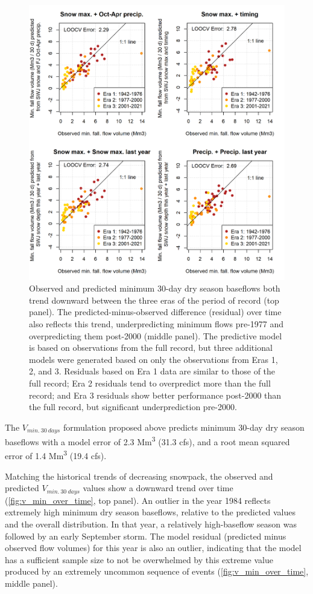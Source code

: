 \documentclass[
]{article}
\begin{document}
\begin{figure}
\includegraphics[width=1\linewidth]{f12} \caption{\label{fig:v_min_over_time} Observed and predicted minimum 30-day dry season baseflows both trend downward between the three eras of the period of record (top panel). The predicted-minus-observed difference (residual) over time also reflects this trend, underpredicting minimum flows pre-1977 and overpredicting them post-2000 (middle panel). The predictive model is based on observations from the full record, but three additional models were generated based on only the observations from Eras 1, 2, and 3. Residuals based on Era 1 data are similar to those of the full record; Era 2 residuals tend to overpredict more than the full record; and Era 3 residuals show better performance post-2000 than the full record, but significant underprediction pre-2000.}\label{fig:v_min_over_time}
\end{figure}

The \(V_{min.~30~days}\) formulation proposed above predicts minimum
30-day dry season baseflows with a model error of 2.3
Mm\textsuperscript{3} (31.3 cfs), and a root mean squared error of 1.4
Mm\textsuperscript{3} (19.4 cfs).

Matching the historical trends of decreasing snowpack, the observed and
predicted \(V_{min.~30~days}\) values show a downward trend over time
(\autoref{fig:v_min_over_time}, top panel). An outlier in the year 1984
reflects extremely high minimum dry season baseflows, relative to the
predicted values and the overall distribution. In that year, a
relatively high-baseflow season was followed by an early September
storm. The model residual (predicted minus observed flow volumes) for
this year is also an outlier, indicating that the model has a sufficient
sample size to not be overwhelmed by this extreme value produced by an
extremely uncommon sequence of events (\autoref{fig:v_min_over_time},
middle panel).
\end{document}
